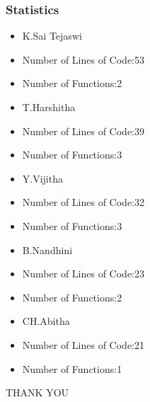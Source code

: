 \documentclass[12pt]{beamer}
\begin{document}
    \begin{frame}
	\frametitle{Statistics}
        \begin{itemize}
        \item K.Sai Tejaswi\\
	     \item Number of Lines of Code:53\\
	     \item Number of Functions:2\\
	     \item T.Harshitha\\
	     \item Number of Lines of Code:39\\
	     \item Number of Functions:3\\
	     \item Y.Vijitha\\
	     \item Number of Lines of Code:32\\
	     \item Number of Functions:3\\
	     \item B.Nandhini\\
	     \item Number of Lines of Code:23\\
	     \item Number of Functions:2\\
	     \item CH.Abitha\\
	     \item Number of Lines of Code:21\\
	     \item Number of Functions:1\\
	     
	     
        \end{itemize}
    \end{frame}
    \begin{frame}
	\begin{center}
	      THANK YOU
	\end{center}
    \end{frame}
\end{document}
